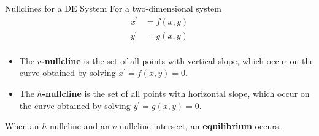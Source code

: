 \documentclass{beamer}
\begin{document}
\begin{frame}
\begin{block}{Nullclines for a DE System}
For a two-dimensional system
\begin{equation*}
\begin{aligned}
x^\prime &= f(x,y) \\
y^\prime &= g (x,y) \\
\end{aligned}
\end{equation*}
\begin{itemize}
\item The \textbf{$v$-nullcline} is the set of all points with vertical slope, which occur on the curve obtained by solving $x^\prime=f (x,y)=0$.
\item The \textbf{$h$-nullcline} is the set of all points with horizontal slope, which occur on the curve obtained by solving $y^\prime=g (x,y)=0$.
\end{itemize}
When an $h$-nullcline and an $v$-nullcline intersect, an \textbf{equilibrium} occurs.
\end{block}
\end{frame}
\end{document}
